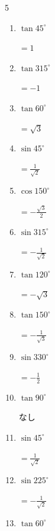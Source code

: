 \begin{multicols}{5}
\begin{enumerate}
        $\displaystyle =-\frac{1}{\sqrt{2}}$

  \item $\displaystyle \tan{45^\circ}$

        $\displaystyle =1$

  \item $\displaystyle \tan{315^\circ}$

        $\displaystyle =-1$

  \item $\displaystyle \tan{60^\circ}$

        $\displaystyle =\sqrt{3}$

  \item $\displaystyle \sin{45^\circ}$

        $\displaystyle =\frac{1}{\sqrt{2}}$

  \item $\displaystyle \cos{150^\circ}$

        $\displaystyle =-\frac{\sqrt{3}}{2}$

  \item $\displaystyle \sin{315^\circ}$

        $\displaystyle =-\frac{1}{\sqrt{2}}$

  \item $\displaystyle \tan{120^\circ}$

        $\displaystyle =-\sqrt{3}$

  \item $\displaystyle \tan{150^\circ}$

        $\displaystyle =-\frac{1}{\sqrt{3}}$

  \item $\displaystyle \sin{330^\circ}$

        $\displaystyle =-\frac{1}{2}$

  \item $\displaystyle \tan{90^\circ}$

        $\displaystyle なし$

  \item $\displaystyle \sin{45^\circ}$

        $\displaystyle =\frac{1}{\sqrt{2}}$

  \item $\displaystyle \sin{225^\circ}$

        $\displaystyle =-\frac{1}{\sqrt{2}}$

\columnbreak %

  \item $\displaystyle \tan{60^\circ}$


\end{enumerate}
\end{multicols}
